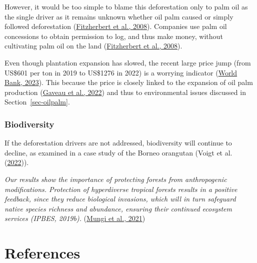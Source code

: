 \documentclass[
  letterpaper,
  DIV=11,
  numbers=noendperiod]{scrreprt}
\begin{document}
However, it would be too simple to blame this deforestation only to palm
oil as the single driver as it remains unknown whether oil palm caused
or simply followed deforestation
(\protect\hyperlink{ref-fitzherbertHowWillOil2008}{Fitzherbert et al.,
2008}). Companies use palm oil concessions to obtain permission to log,
and thus make money, without cultivating palm oil on the land
(\protect\hyperlink{ref-fitzherbertHowWillOil2008}{Fitzherbert et al.,
2008}).

Even though plantation expansion has slowed, the recent large price jump
(from US\$601 per ton in 2019 to US\$1276 in 2022) is a worrying
indicator (\protect\hyperlink{ref-worldbankAveragePricesPalm2023}{World
Bank, 2023}). This because the price is closely linked to the expansion
of oil palm production
(\protect\hyperlink{ref-gaveauSlowingDeforestationIndonesia2022}{Gaveau
et al., 2022}) and thus to environmental issues discussed in
Section~\ref{sec-oilpalm}.

\hypertarget{biodiversity}{%
\subsection{Biodiversity}\label{biodiversity}}

If the deforestation drivers are not addressed, biodiversity will
continue to decline, as examined in a case study of the Borneo orangutan
(Voigt et al.
(\protect\hyperlink{ref-voigtDeforestationProjectionsImply2022}{2022})).

\emph{Our results show the importance of protecting forests from
anthropogenic modifications. Protection of hyperdiverse tropical forests
results in a positive feedback, since they reduce biological invasions,
which will in turn safeguard native species richness and abundance,
ensuring their continued ecosystem services (IPBES, 2019b).}
(\protect\hyperlink{ref-mungiRoleSpeciesRichness2021}{Mungi et al.,
2021})


\hypertarget{references}{%
\chapter{References}\label{references}}
\end{document}
